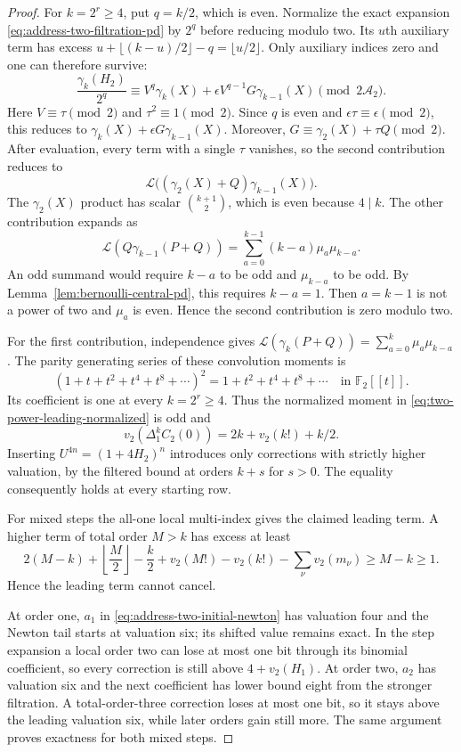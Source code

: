 \begin{proof}
For $k=2^r\geq4$, put $q=k/2$, which is even. Normalize the exact
expansion \eqref{eq:address-two-filtration-pd} by $2^q$ before reducing
modulo two. Its $u$th auxiliary term has excess
$u+\lfloor(k-u)/2\rfloor-q=\lfloor u/2\rfloor$.
Only auxiliary indices zero and one can therefore survive:
\begin{equation}
 \frac{\gamma_k(H_2)}{2^q}
 \equiv V^q\gamma_k(X)
       +\epsilon V^{q-1}G\gamma_{k-1}(X)
                                \pmod{2\mathcal A_2}.
 \label{eq:two-power-leading-normalized}
\end{equation}
Here $V\equiv\tau\pmod2$ and $\tau^2\equiv1\pmod2$.
Since $q$ is even and $\epsilon\tau\equiv\epsilon\pmod2$, this reduces
to $\gamma_k(X)+\epsilon G\gamma_{k-1}(X)$.
Moreover, $G\equiv\gamma_2(X)+\tau Q\pmod2$.
After evaluation, every term with a single $\tau$ vanishes, so the
second contribution reduces to
\[
 \mathcal L\bigl((\gamma_2(X)+Q)\gamma_{k-1}(X)\bigr).
\]
The $\gamma_2(X)$ product has scalar $\binom{k+1}{2}$, which is even
because $4\mid k$. The other contribution expands as
\begin{equation}
 \mathcal L(Q\gamma_{k-1}(P+Q))
    =\sum_{a=0}^{k-1}(k-a)\mu_a\mu_{k-a}.
 \label{eq:two-power-Q-evaluation}
\end{equation}
An odd summand would require $k-a$ to be odd and $\mu_{k-a}$ to be
odd. By Lemma~\ref{lem:bernoulli-central-pd}, this requires $k-a=1$.
Then $a=k-1$ is not a power of two and $\mu_a$ is even. Hence the
second contribution is zero modulo two.

For the first contribution, independence gives
$\mathcal L(\gamma_k(P+Q))=\sum_{a=0}^k\mu_a\mu_{k-a}$.
The parity generating series of these convolution moments is
\[
 (1+t+t^2+t^4+t^8+\cdots)^2
        =1+t^2+t^4+t^8+\cdots\quad\text{in }\mathbb F_2[[t]].
\]
Its coefficient is one at every $k=2^r\geq4$. Thus the normalized
moment in \eqref{eq:two-power-leading-normalized} is odd and
\[
 v_2(\Delta_1^kC_2(0))=2k+v_2(k!)+k/2.
\]
Inserting $U^{4n}=(1+4H_2)^n$ introduces only corrections with strictly
higher valuation, by the filtered bound at orders $k+s$ for $s>0$.
The equality consequently holds at every starting row.

For mixed steps the all-one local multi-index gives the claimed leading
term. A higher term of total order $M>k$ has excess at least
\[
 2(M-k)+\left\lfloor\frac M2\right\rfloor-\frac k2
       +v_2(M!)-v_2(k!)-\sum_\nu v_2(m_\nu)
       \geq M-k\geq1.
\]
Hence the leading term cannot cancel.

At order one, $a_1$ in \eqref{eq:address-two-initial-newton} has
valuation four and the Newton tail starts at valuation six; its shifted
value remains exact. In the step expansion a local order two can lose
at most one bit through its binomial coefficient, so every correction
is still above $4+v_2(H_1)$. At order two, $a_2$ has valuation six and
the next coefficient has lower bound eight from the stronger
filtration. A total-order-three correction loses at most one bit,
so it stays above the leading valuation six, while later orders gain
still more. The same argument proves exactness for both mixed steps.
\end{proof}

